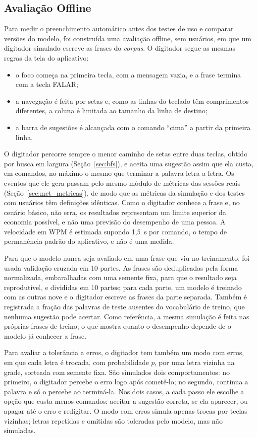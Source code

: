 \subsection{Avaliação Offline} \label{sec:met_avaliacao}

Para medir o preenchimento automático antes dos testes de uso e comparar versões do modelo, foi construída uma avaliação offline, sem usuários, em que um digitador simulado escreve as frases do \textit{corpus}. O digitador segue as mesmas regras da tela do aplicativo:
\begin{itemize}
    \item o foco começa na primeira tecla, com a mensagem vazia, e a frase termina com a tecla FALAR;
    \item a navegação é feita por setas e, como as linhas do teclado têm comprimentos diferentes, a coluna é limitada ao tamanho da linha de destino;
    \item a barra de sugestões é alcançada com o comando ``cima'' a partir da primeira linha.
\end{itemize}
O digitador percorre sempre o menor caminho de setas entre duas teclas, obtido por busca em largura (Seção~\ref{sec:bfs}), e aceita uma sugestão assim que ela custa, em comandos, no máximo o mesmo que terminar a palavra letra a letra. Os eventos que ele gera passam pelo mesmo módulo de métricas das sessões reais (Seção~\ref{sec:met_metricas}), de modo que as métricas da simulação e dos testes com usuários têm definições idênticas. Como o digitador conhece a frase e, no cenário básico, não erra, os resultados representam um limite superior da economia possível, e não uma previsão do desempenho de uma pessoa. A velocidade em WPM é estimada supondo 1,5~s por comando, o tempo de permanência padrão do aplicativo, e não é uma medida.

Para que o modelo nunca seja avaliado em uma frase que viu no treinamento, foi usada validação cruzada em 10 partes. As frases são deduplicadas pela forma normalizada, embaralhadas com uma semente fixa, para que o resultado seja reprodutível, e divididas em 10 partes; para cada parte, um modelo é treinado com as outras nove e o digitador escreve as frases da parte separada. Também é registrada a fração das palavras de teste ausentes do vocabulário de treino, que nenhuma sugestão pode acertar. Como referência, a mesma simulação é feita nas próprias frases de treino, o que mostra quanto o desempenho depende de o modelo já conhecer a frase.

Para avaliar a tolerância a erros, o digitador tem também um modo com erros, em que cada letra é trocada, com probabilidade $p$, por uma letra vizinha na grade, sorteada com semente fixa. São simulados dois comportamentos: no primeiro, o digitador percebe o erro logo após cometê-lo; no segundo, continua a palavra e só o percebe ao terminá-la. Nos dois casos, a cada passo ele escolhe a opção que custa menos comandos: aceitar a sugestão correta, se ela aparecer, ou apagar até o erro e redigitar. O modo com erros simula apenas trocas por teclas vizinhas; letras repetidas e omitidas são toleradas pelo modelo, mas não simuladas.

